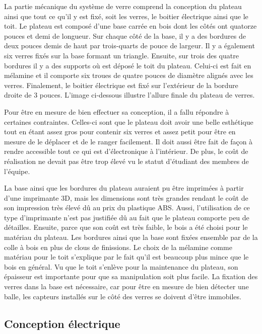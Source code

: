 La partie mécanique du système de verre comprend la conception du plateau ainsi que tout ce qu’il y est fixé, soit les verres, le boitier électrique ainsi que le toit.
Le plateau est composé d’une base carrée en bois dont les côtés ont quatorze pouces et demi de longueur.
Sur chaque côté de la base, il y a des bordures de deux pouces demis de haut par trois-quarts de pouce de largeur.
Il y a également six verres fixés sur la base formant un triangle.
Ensuite, sur trois des quatre bordures il y a des supports où est déposé le toit du plateau.
Celui-ci est fait en mélamine et il comporte six troues de quatre pouces de diamètre alignés avec les verres.
Finalement, le boitier électrique est fixé sur l’extérieur de la bordure droite de 3 pouces.
L’image  ci-dessous illustre l’allure finale du plateau de verres.


Pour être en mesure de bien effectuer sa conception, il a fallu répondre à certaines contraintes.
Celles-ci sont que le plateau doit avoir une belle esthétique tout en étant assez gros pour contenir six verres et assez petit pour être en mesure de le déplacer et de le ranger facilement. Il doit aussi être fait de façon à rendre accessible tout ce qui est d’électronique à l’intérieur.
De plus, le coût de réalisation ne devait pas être trop élevé vu le statut d’étudiant des membres de l’équipe.

La base ainsi que les bordures du plateau auraient pu être imprimées à partir d’une imprimante 3D, mais les dimensions sont très grandes rendant le coût de son impression très élevé dû au prix du plastique ABS.
Aussi, l’utilisation de ce type d’imprimante n’est pas justifiée dû au fait que le plateau comporte peu de détailles.
Ensuite, parce que son coût est très faible, le bois a été choisi pour le matériau du plateau.
Les bordures ainsi que la base sont fixées ensemble par de la colle à bois en plus de clous de finissions.
Le choix de la mélamine comme matériau pour le toit s’explique par le fait qu’il est beaucoup plus mince que le bois en général.
Vu que le toit s’enlève pour la maintenance du plateau, son épaisseur est importante pour que sa manipulation soit plus facile.
La fixation des verres dans la base est nécessaire, car pour être en mesure de bien détecter une balle, les capteurs installés sur le côté des verres se doivent d’être immobiles.

\subsection{Conception électrique}

